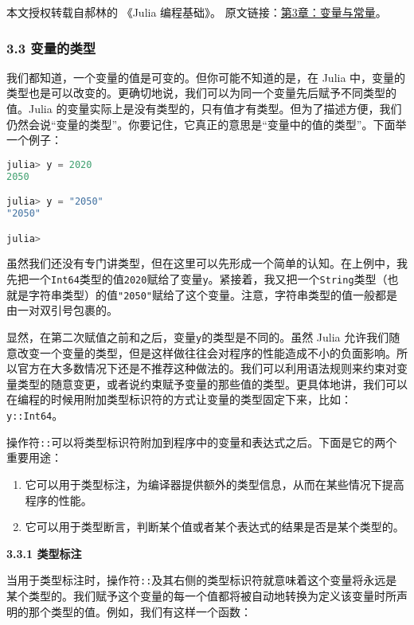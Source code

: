 
本文授权转载自郝林的 《Julia 编程基础》。 原文链接：\href{https://github.com/hyper0x/JuliaBasics/blob/master/book/ch03.md}{第3章：变量与常量}。


\subsubsection{3.3 变量的类型}

我们都知道，一个变量的值是可变的。但你可能不知道的是，在 Julia 中，变量的类型也是可以改变的。更确切地说，我们可以为同一个变量先后赋予不同类型的值。Julia 的变量实际上是没有类型的，只有值才有类型。但为了描述方便，我们仍然会说“变量的类型”。你要记住，它真正的意思是“变量中的值的类型”。下面举一个例子：

\begin{lstlisting}[language=julia]
julia> y = 2020
2050

julia> y = "2050"
"2050"

julia> 
\end{lstlisting}

虽然我们还没有专门讲类型，但在这里可以先形成一个简单的认知。在上例中，我先把一个\verb`Int64`类型的值\verb`2020`赋给了变量\verb`y`。紧接着，我又把一个\verb`String`类型（也就是字符串类型）的值\verb`"2050"`赋给了这个变量。注意，字符串类型的值一般都是由一对双引号包裹的。

显然，在第二次赋值之前和之后，变量\verb`y`的类型是不同的。虽然 Julia 允许我们随意改变一个变量的类型，但是这样做往往会对程序的性能造成不小的负面影响。所以官方在大多数情况下还是不推荐这种做法的。我们可以利用语法规则来约束对变量类型的随意变更，或者说约束赋予变量的那些值的类型。更具体地讲，我们可以在编程的时候用附加类型标识符的方式让变量的类型固定下来，比如：\verb`y::Int64`。

操作符\verb`::`可以将类型标识符附加到程序中的变量和表达式之后。下面是它的两个重要用途：

\begin{enumerate}
\item 它可以用于类型标注，为编译器提供额外的类型信息，从而在某些情况下提高程序的性能。
\item 它可以用于类型断言，判断某个值或者某个表达式的结果是否是某个类型的。
\end{enumerate}

\textbf{3.3.1 类型标注}

当用于类型标注时，操作符\verb`::`及其右侧的类型标识符就意味着这个变量将永远是某个类型的。我们赋予这个变量的每一个值都将被自动地转换为定义该变量时所声明的那个类型的值。例如，我们有这样一个函数：

